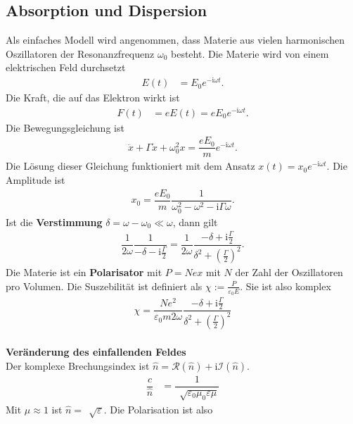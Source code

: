 \documentclass[a4paper,12pt]{article}
\numberwithin{equation}{section}
\begin{document}
\subsection{Absorption und Dispersion}
Als einfaches Modell wird angenommen, dass Materie aus vielen harmonischen Oszillatoren der Resonanzfrequenz $\omega _0$ besteht. Die Materie wird von einem elektrischen Feld durchsetzt
\begin{align} 
        E\left(t\right)&=E_0e^{-\text{i}\omega t}
.\end{align} 
Die Kraft, die auf das Elektron wirkt ist
\begin{align} 
        F\left(t\right)&=eE\left(t\right)=eE_0e^{-\text{i}\omega t}
.\end{align} 
Die Bewegungsgleichung ist
\begin{align} 
        \ddot{x}+\Gamma \dot{x}+\omega _0^2x=\dfrac{eE_0}{m}e^{-\text{i}\omega t}
.\end{align} 
Die Lösung dieser Gleichung funktioniert mit dem Ansatz $x\left(t\right)=x_0e^{-\text{i}\omega t}$. Die Amplitude ist
\begin{align} 
        x_0=\dfrac{eE_0}{m}\dfrac{1}{\omega _0^2-\omega ^2-\text{i}\Gamma \omega }
.\end{align} 
Ist die \textbf{Verstimmung} $\delta =\omega -\omega _0\ll \omega $, dann gilt
\begin{align} 
        \dfrac{1}{2\omega }\dfrac{1}{-\delta -\text{i}\tfrac{\Gamma }{2}}=\dfrac{1}{2\omega }\dfrac{-\delta +\text{i}\tfrac{\Gamma }{2}}{\delta ^2+\left(\tfrac{\Gamma }{2}\right)^2}
.\end{align} 
Die Materie ist ein \textbf{Polarisator} mit $P=Nex$ mit $N$ der Zahl der Oszillatoren pro Volumen. Die Suszebilität ist definiert als $\chi:=\tfrac{P}{\varepsilon _0E}$. Sie ist also komplex
\begin{align} 
        \chi=\dfrac{Ne^2}{\varepsilon _0m2\omega }\dfrac{-\delta +\text{i}\tfrac{\Gamma }{2}}{\delta ^2+\left(\tfrac{\Gamma }{2}\right)^2}
\end{align} 
\hfill\\\textbf{Veränderung des einfallenden Feldes}\\ 
Der komplexe Brechungsindex ist $\hat{n}=\mathcal{R}\left(\hat{n}\right)+\text{i}\mathcal{I}\left(\hat{n}\right)$.
\begin{align} 
        \dfrac{c}{\hat{n}}&=\dfrac{1}{\,\sqrt[]{\varepsilon _0\mu _0\varepsilon \mu }}
\end{align} 
Mit $\mu \approx 1$ ist $\hat{n}=\,\sqrt[]{\varepsilon }$. Die Polarisation ist also
\end{document}
